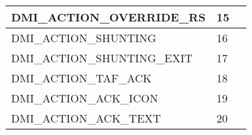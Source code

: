\documentclass{template/openetcs_article}
\begin{document}
\begin{longtable}{|l|l|l|}
		\begin{minipage}[t]{0.60\linewidth}	DMI\_ACTION\_OVERRIDE\_RS\end{minipage}
	&	\begin{minipage}[t]{0.15\linewidth} 15 	\end{minipage}
	&	\begin{minipage}[t]{0.30\linewidth} \end{minipage}\\
		\hline
		\begin{minipage}[t]{0.60\linewidth}	DMI\_ACTION\_SHUNTING\end{minipage}
	&	\begin{minipage}[t]{0.15\linewidth} 16 	\end{minipage}
	&	\begin{minipage}[t]{0.30\linewidth} \end{minipage}\\
		\hline
		\begin{minipage}[t]{0.60\linewidth}	DMI\_ACTION\_SHUNTING\_EXIT\end{minipage}
	&	\begin{minipage}[t]{0.15\linewidth} 17 	\end{minipage}
	&	\begin{minipage}[t]{0.30\linewidth} \end{minipage}\\
		\hline
		\begin{minipage}[t]{0.60\linewidth}	DMI\_ACTION\_TAF\_ACK\end{minipage}
	&	\begin{minipage}[t]{0.15\linewidth} 18 	\end{minipage}
	&	\begin{minipage}[t]{0.30\linewidth} \end{minipage}\\
		\hline
		\begin{minipage}[t]{0.60\linewidth}	DMI\_ACTION\_ACK\_ICON\end{minipage}
	&	\begin{minipage}[t]{0.15\linewidth} 19 	\end{minipage}
	&	\begin{minipage}[t]{0.30\linewidth} \end{minipage}\\
		\hline
		\begin{minipage}[t]{0.60\linewidth}	DMI\_ACTION\_ACK\_TEXT\end{minipage}
	&	\begin{minipage}[t]{0.15\linewidth} 20 	\end{minipage}

\end{longtable}
\end{document}
